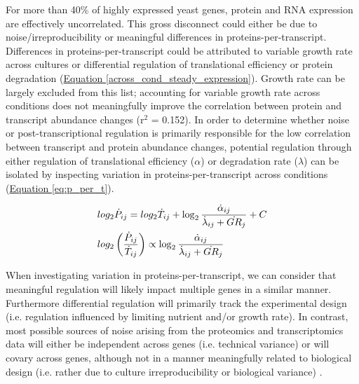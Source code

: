 For more than 40\% of highly expressed yeast genes, protein and RNA expression are effectively uncorrelated.  This gross disconnect could either be due to noise/irreproducibility or meaningful differences in proteins-per-transcript. Differences in proteins-per-transcript could be attributed to variable growth rate across cultures or differential regulation of translational efficiency or protein degradation (\hyperref[across_cond_steady_expression]{Equation \ref{across_cond_steady_expression}}).  Growth rate can be largely excluded from this list; accounting for variable growth rate across conditions does not meaningfully improve the correlation between protein and transcript abundance changes (r$^{2}$ = 0.152).  In order to determine whether noise or post-transcriptional regulation is primarily responsible for the low correlation between transcript and protein abundance changes, potential regulation through either regulation of translational efficiency ($\alpha$) or degradation rate ($\lambda$) can be isolated by inspecting variation in proteins-per-transcript across conditions (\hyperref[eq:p_per_t]{Equation \ref{eq:p_per_t}}).

\begin{align}
&log_{2}\dot{P}_{ij} = log_{2}\dot{T}_{ij} + \log_{2}\frac{\dot{\alpha}_{ij}}{\dot{\lambda}_{ij} + \dot{GR}_{j}} + C\notag\\
&log_{2}\left(\frac{\dot{P}_{ij}}{\dot{T}_{ij}}\right) \propto \log_{2}\frac{\dot{\alpha}_{ij}}{\dot{\lambda}_{ij} + \dot{GR}_{j}}\notag\\
\label{eq:p_per_t}
\end{align}

When investigating variation in proteins-per-transcript, we can consider that meaningful regulation will likely impact multiple genes in a similar manner.  Furthermore differential regulation will primarily track the experimental design (i.e. regulation influenced by limiting nutrient and/or growth rate).  In contrast, most possible sources of noise arising from the proteomics and transcriptomics data will either be independent across genes (i.e. technical variance) or will covary across genes, although not in a manner meaningfully related to biological design (i.e. rather due to culture irreproducibility or biological variance) \cite{Leek:2007kn}.


